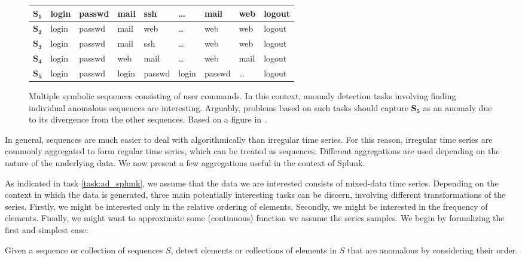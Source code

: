 \begin{figure}[htb]
    \begin{center}
        \begin{tabular}{| l | l l l l l l l l |}
            \hline
            $\mathbf{S_1}$ & login & passwd & mail & ssh & \dots & mail & web & logout \\ \hline
            $\mathbf{S_2}$ & login & passwd & mail & web & \dots & web & web & logout \\ \hline
            $\mathbf{S_3}$ & login & passwd & mail & ssh & \dots & web & web & logout \\ \hline
            $\mathbf{S_4}$ & login & passwd & web & mail & \dots & web & mail & logout \\ \hline
            $\mathbf{S_5}$ & login & passwd & login & passwd & login & passwd & \dots & logout \\\hline
        \end{tabular}
    \end{center}
    \caption{{\small Multiple symbolic sequences consisting of user commands. In this context, anomaly detection tasks involving finding individual anomalous sequences are interesting. Arguably, problems based on such tasks should capture $\mathbf{S_5}$ as an anomaly due to its divergence from the other sequences. Based on a figure in \cite{chandola2}.}}
    \label{fig:calls}
\end{figure}

In general, sequences are much easier to deal with algorithmically than irregular time series. For this reason, irregular time series are commonly aggregated to form regular time series, which can be treated as sequences. Different aggregations are used depending on the nature of the underlying data. We now present a few aggregations useful in the context of Splunk.

As indicated in task \ref{task:ad_splunk}, we assume that the data we are interested consists of mixed-data time series. Depending on the context in which the data is generated, three main potentially interesting tasks can be discern, involving different transformations of the series. Firstly, we might be interested only in the relative ordering of elements. Secondly, we might be interested in the frequency of elements. Finally, we might want to approximate some (continuous) function we assume the series samples. We begin by formalizing the first and simplest case:

\begin{task}
  \label{task:sequential_anomaly_detection}
  Given a sequence or collection of sequences $S$, detect elements or collections of elements in $S$ that are anomalous by considering their order.
\end{task}

